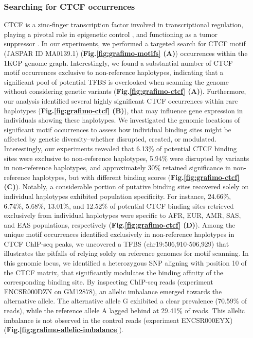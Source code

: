 \documentclass[a4paper, titlepage, openright]{book}
\begin{document}
\subsubsection{Searching for CTCF occurrences}
CTCF is a zinc-finger transcription factor involved in transcriptional regulation, playing a pivotal role in epigenetic control \citep{ishihara2006ctcf}, and functioning as a tumor suppressor \citep{fiorentino2012tumor}. In our experiments, we performed a targeted search for CTCF motif (JASPAR ID MA0139.1) (\textbf{Fig.\ref{fig:grafimo-motifs} (A)}) occurrences within the 1KGP genome graph. Interestingly, we found a substantial number of CTCF motif occurrences exclusive to non-reference haplotypes, indicating that a significant pool of potential TFBS is overlooked when scanning the genome without considering genetic variants (\textbf{Fig.\ref{fig:grafimo-ctcf} (A)}). Furthermore, our analysis identified several highly significant CTCF occurrences within rare haplotypes (\textbf{Fig.\ref{fig:grafimo-ctcf} (B)}), that may influence gene expression in individuals showing these haplotypes. We investigated the genomic locations of significant motif occurrences to assess how individual binding sites might be affected by genetic diversity--whether disrupted, created, or modulated. Interestingly, our experiments revealed that 6.13\% of potential CTCF binding sites were exclusive to non-reference haplotypes, 5.94\% were disrupted by variants in non-reference haplotypes, and approximately 30\% retained significance in non-reference haplotypes, but with different binding scores (\textbf{Fig.\ref{fig:grafimo-ctcf} (C)}). Notably, a considerable portion of putative binding sites recovered solely on individual haplotypes exhibited population specificity. For instance, 24.66\%, 6.74\%, 5.68\%, 13.01\%, and 12.52\% of potential CTCF binding sites retrieved exclusively from individual haplotypes were specific to AFR, EUR, AMR, SAS, and EAS populations, respectively (\textbf{Fig.\ref{fig:grafimo-ctcf} (D)}). Among the unique motif occurrences identified exclusively in non-reference haplotypes in CTCF ChIP-seq peaks, we uncovered a TFBS (chr19:506,910-506,929) that illustrates the pitfalls of relying solely on reference genomes for motif scanning. In this genomic locus, we identified a heterozygous SNP aligning with position 10 of the CTCF matrix, that significantly modulates the binding affinity of the corresponding binding site. By inspecting ChIP-seq reads (experiment ENCSR000DZN on GM12878), an allelic imbalance emerged towards the alternative allele. The alternative allele G exhibited a clear prevalence (70.59\% of reads), while the reference allele A lagged behind at 29.41\% of reads. This allelic imbalance is not observed in the control reads (experiment ENCSR000EYX) (\textbf{Fig.\ref{fig:grafimo-allelic-imbalance}}).
\end{document}

